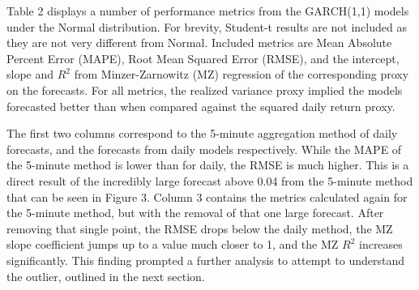\documentclass[10pt,twoside,printwatermark=false]{pinp}
\begin{document}
Table 2 displays a number of performance metrics from the GARCH(1,1)
models under the Normal distribution. For brevity, Student-t results are
not included as they are not very different from Normal. Included
metrics are Mean Absolute Percent Error (MAPE), Root Mean Squared Error
(RMSE), and the intercept, slope and \(R^2\) from Minzer-Zarnowitz (MZ)
regression of the corresponding proxy on the forecasts. For all metrics,
the realized variance proxy implied the models forecasted better than
when compared against the squared daily return proxy.

The first two columns correspond to the 5-minute aggregation method of
daily forecasts, and the forecasts from daily models respectively. While
the MAPE of the 5-minute method is lower than for daily, the RMSE is
much higher. This is a direct result of the incredibly large forecast
above 0.04 from the 5-minute method that can be seen in Figure 3. Column
3 contains the metrics calculated again for the 5-minute method, but
with the removal of that one large forecast. After removing that single
point, the RMSE drops below the daily method, the MZ slope coefficient
jumps up to a value much closer to 1, and the MZ \(R^2\) increases
significantly. This finding prompted a further analysis to attempt to
understand the outlier, outlined in the next section.
\end{document}
